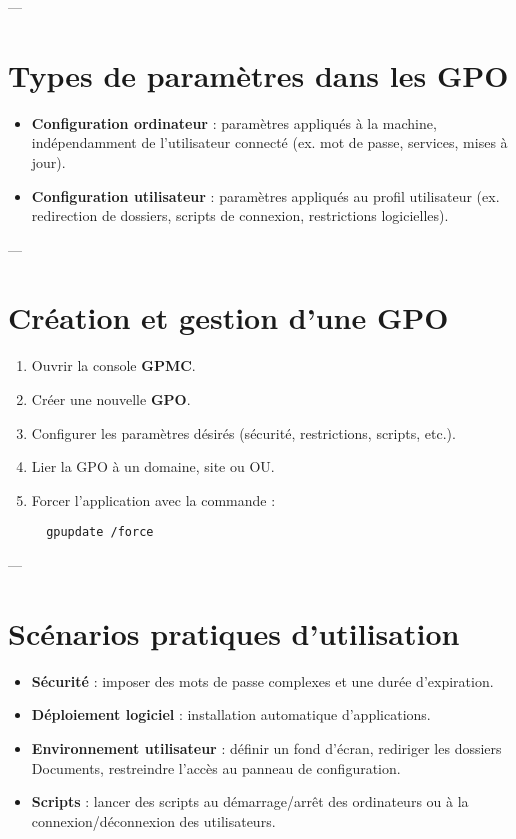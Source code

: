 \documentclass[a4paper,12pt]{article}
\begin{document}
---

\section{Types de paramètres dans les GPO}
\begin{tcolorbox}[colback=purple!5!white,colframe=purple!70!black,title=Deux grandes catégories]
\begin{itemize}
  \item \textbf{Configuration ordinateur} : paramètres appliqués à la machine, indépendamment de l’utilisateur connecté (ex. mot de passe, services, mises à jour).
  \item \textbf{Configuration utilisateur} : paramètres appliqués au profil utilisateur (ex. redirection de dossiers, scripts de connexion, restrictions logicielles).
\end{itemize}
\end{tcolorbox}

---

\section{Création et gestion d’une GPO}
\begin{tcolorbox}[colback=yellow!5!white,colframe=yellow!60!black,title=Étapes principales]
\begin{enumerate}
  \item Ouvrir la console \textbf{GPMC}.
  \item Créer une nouvelle \textbf{GPO}.
  \item Configurer les paramètres désirés (sécurité, restrictions, scripts, etc.).
  \item Lier la GPO à un domaine, site ou OU.
  \item Forcer l’application avec la commande :
  \begin{verbatim}
  gpupdate /force
  \end{verbatim}
\end{enumerate}
\end{tcolorbox}

---

\section{Scénarios pratiques d’utilisation}
\begin{tcolorbox}[colback=red!5!white,colframe=red!70!black,title=Exemples concrets]
\begin{itemize}
  \item \textbf{Sécurité} : imposer des mots de passe complexes et une durée d’expiration.
  \item \textbf{Déploiement logiciel} : installation automatique d’applications.
  \item \textbf{Environnement utilisateur} : définir un fond d’écran, rediriger les dossiers Documents, restreindre l’accès au panneau de configuration.
  \item \textbf{Scripts} : lancer des scripts au démarrage/arrêt des ordinateurs ou à la connexion/déconnexion des utilisateurs.
\end{itemize}
\end{tcolorbox}
\end{document}
